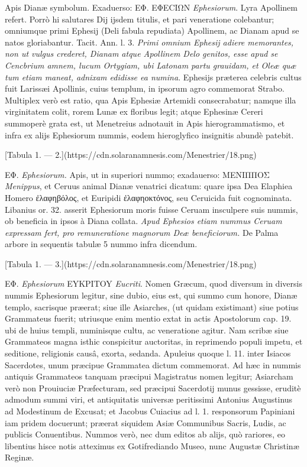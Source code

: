 \documentclass[a4paper, 11pt, oneside, polutonikogreek, latin]{article}
\begin{document}
Apis Dianæ symbolum. Exaduerso: EΦ. EΦECIΩN \emph{Ephesiorum}. Lyra Apollinem refert. Porrò hi salutares Dij ijsdem titulis, et pari veneratione colebantur; omniumque primi Ephesij (Deli fabula repudiata) Apollinem, ac Dianam apud se natos gloriabantur. Tacit. Ann. l. 3. \emph{Primi omnium Ephesij adiere memorantes, non ut vulgus crederet, Dianam atque Apollinem Delo genitos, esse apud se Cencbrium amnem, lucum Ortygiam, ubi Latonam partu grauidam, et Oleæ quæ tum etiam maneat, adnixam edidisse ea numina}. Ephesijs præterea celebris cultus fuit Larissæi Apollinis, cuius templum, in ipsorum agro commemorat Strabo. Multiplex verò est ratio, qua Apis Ephesiæ Artemidi consecrabatur; namque illa virginitatem colit, rorem Lunæ ex floribus legit; atque Ephesinæ Cereri summoperè grata est, ut Menetreius adnotauit in Apis hierogrammatismo, et infra ex alijs Ephesiorum nummis, eodem hieroglyfico insignitis abundè patebit.

[Tabula 1. --- 2.](https://cdn.solaranamnesis.com/Menestrier/18.png)

EΦ. \emph{Ephesiorum.} Apis, ut in superiori nummo; exadauerso: MENIΠΠOΣ \emph{Menippus}, et Ceruus animal Dianæ venatrici dicatum: quare ipsa Dea Elaphiea Homero ἐλαφηβόλος, et Euripidi ἐλαφηοκτόνος, seu Ceruicida fuit cognominata. Libanius or. 32. asserit Ephesiorum moris fuisse Ceruam insculpere suis nummis, ob beneficia in ipsos à Diana collata. \emph{Apud Ephesios etiam nummus Ceruam expressam fert, pro remuneratione magnorum Deæ beneficiorum.} De Palma arbore in sequentis tabulæ 5 nummo infra dicendum.

[Tabula 1. --- 3.](https://cdn.solaranamnesis.com/Menestrier/18.png)

EΦ. \emph{Ephesiorum} EYKPITOY \emph{Eucriti}. Nomen Græcum, quod diversum in diversis nummis Ephesiorum legitur, sine dubio, eius est, qui summo cum honore, Dianæ templo, sacrisque præerat; siue ille Asiarches, (ut quidam existimant) siue potius Grammateus fuerit; utriusque enim mentio extat in actis Apostolorum cap. 19. ubi de huius templi, numinisque cultu, ac veneratione agitur. Nam scribæ siue Grammateos magna isthic conspicitur auctoritas, in reprimendo populi impetu, et seditione, religionis causâ, exorta, sedanda. Apuleius quoque l. 11. inter Isiacos Sacerdotes, unum præcipue Grammatea dictum commemorat. Ad hæc in nummis antiquis Grammateos tanquam præcipui Magistratus nomen legitur; Asiarcham verò non Prouiuciæ Præfecturam, sed præcipui Sacerdotij munus gessisse, eruditè admodum summi viri, et antiquitatis universæ peritissimi Antonius Augustinus ad Modestinum de Excusat; et Jacobus Cuiacius ad l. 1. responsorum Papiniani iam pridem docuerunt; præerat siquidem Asiæ Communibus Sacris, Ludis, ac publicis Conuentibus. Nummos verò, nec dum editos ab alijs, quò rariores, eo libentius hisce notis atteximus ex Gotifrediando Museo, nunc Augustæ Christinæ Reginæ.
\end{document}
